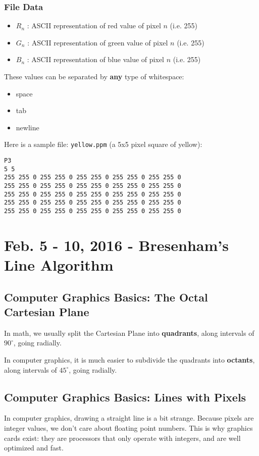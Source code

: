 \documentclass[11pt,fleqn]{article}
\theoremstyle{definition}
\begin{document}
\subsubsection{File Data}
\begin{itemize}
    \item $R_n$ : ASCII representation of red value of pixel $n$ (i.e. 255)
    \item $G_n$ : ASCII representation of green value of pixel $n$ (i.e. 255)
    \item $B_n$ : ASCII representation of blue value of pixel $n$ (i.e. 255)
\end{itemize}

These values can be separated by \textbf{any} type of whitespace:
\begin{itemize}
    \item space
    \item tab
    \item newline
\end{itemize}

Here is a sample file: \texttt{yellow.ppm} (a 5x5 pixel square of yellow):

\begin{verbatim}
P3
5 5
255 255 0 255 255 0 255 255 0 255 255 0 255 255 0
255 255 0 255 255 0 255 255 0 255 255 0 255 255 0
255 255 0 255 255 0 255 255 0 255 255 0 255 255 0
255 255 0 255 255 0 255 255 0 255 255 0 255 255 0
255 255 0 255 255 0 255 255 0 255 255 0 255 255 0
\end{verbatim}

\newpage
\section{Feb. 5 - 10, 2016 - Bresenham's Line Algorithm}

\subsection{Computer Graphics Basics: The Octal Cartesian Plane}
In math, we usually split the Cartesian Plane into \textbf{quadrants}, along
intervals of $90^{\circ}$, going radially.

In computer graphics, it is much easier to subdivide the quadrants into
\textbf{octants}, along intervals of $45^{\circ}$, going radially.

\subsection{Computer Graphics Basics: Lines with Pixels}
In computer graphics, drawing a straight line is a bit strange. Because pixels are
integer values, we don't care about floating point numbers. This is why graphics
cards exist: they are processors that only operate with integers, and are well
optimized and fast.
\end{document}
